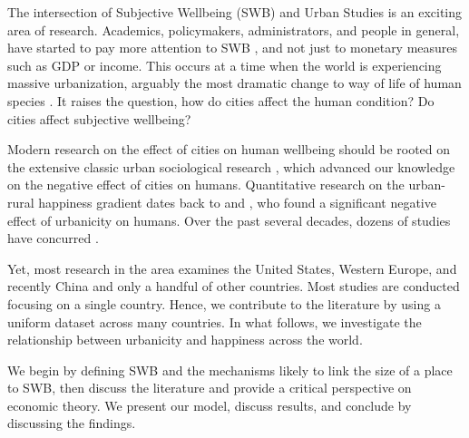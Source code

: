 \documentclass[10pt, letterpaper]{article}
\begin{document}
The intersection of %
 Subjective Wellbeing (SWB) %
 and Urban Studies is an exciting area of research.
Academics, policymakers, administrators, and people in general, have started to pay more
attention to SWB%
, and not just to monetary measures such
as GDP or income. %
 This occurs at a time when the world is experiencing massive
urbanization, arguably the most dramatic change to  way of life of human species \citep{wirth38,hansonCityJournalautumn15}.  It raises the question, how do cities affect the human condition? Do cities affect subjective wellbeing?


Modern research on the effect of cities on human wellbeing should be rooted on
the extensive classic urban sociological research \citep{tonnies57,wirth38,simmel03,park15,park84}, 
which advanced our knowledge on the negative effect of cities on humans.
%
Quantitative research on the urban-rural happiness gradient dates back to
\cite{gurin60} and \cite{campbell76etal}, who found a significant negative
effect of urbanicity on humans. Over the past several decades, dozens of studies
have concurred \citep[for a review see][]{aokCityBook15}.

Yet, most research in the area examines the United States, Western Europe, and
recently China and only a handful of other countries. Most studies are conducted
focusing on a single country. Hence, we contribute to the literature by using a
uniform dataset across many countries. In what follows, we investigate the relationship between urbanicity and
happiness across the world.

We begin by defining SWB and the mechanisms likely
to link the size of a place to SWB, then discuss the literature and provide a
critical perspective on economic
theory. We present our model, %
 discuss results, and conclude by discussing the findings. %
\end{document}

